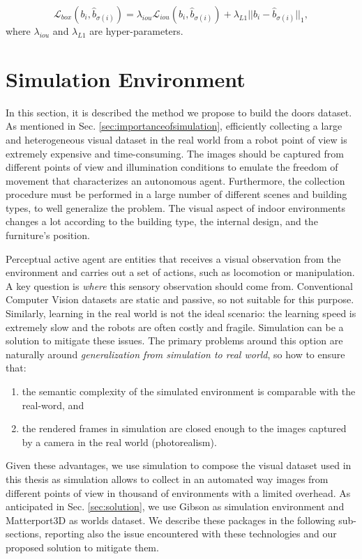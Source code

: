 \begin{equation}
\label{eq:bounding_box_loss}
\mathcal{L}_{box}(b_i, \hat b_{\sigma(i)}) = \lambda_{iou}\mathcal{L}_{iou}(b_i, \hat b_{\sigma(i)}) + \lambda_{L1}||b_i - \hat b_{\sigma(i)}||_1,
\end{equation}
where $\lambda_{iou}$ and $\lambda_{L1}$ are hyper-parameters.

\section{Simulation Environment}

In this section, it is described the method we propose to build the doors dataset. As mentioned in Sec. \ref{sec:importanceofsimulation}, efficiently collecting a large and heterogeneous visual dataset in the real world from a robot point of view is extremely expensive and time-consuming. The images should be captured from different points of view and illumination conditions to emulate the freedom of movement that characterizes an autonomous agent. Furthermore, the collection procedure must be performed in a large number of different scenes and building types, to well generalize the problem. The visual aspect of indoor environments changes a lot according to the building type, the internal design, and the furniture's position. 

Perceptual active agent are entities that receives a visual observation from the environment and carries out a set of actions, such as locomotion or manipulation. A key question is \textit{where} this sensory observation should come from. Conventional Computer Vision datasets \cite{coco, imagenet} are static and passive, so not suitable for this purpose.  Similarly, learning in the real world is not the ideal scenario: the learning speed is extremely slow and the robots are often costly and fragile. Simulation can be a solution to mitigate these issues. 
The primary problems around this option are naturally around \textit{generalization
	from simulation to real world}, so how to ensure that:
\begin{enumerate}
	\item \label{enum:generalizationtorealworld1} the semantic
	complexity of the simulated environment is comparable with the real-word, and
	\item \label{enum:generalizationtorealworld2} the rendered frames in simulation are closed enough to the images captured by a camera in the real world (photorealism).
\end{enumerate} 
Given these advantages, we use simulation to compose the visual dataset used in this thesis as simulation allows to collect in an automated way images from different points of view in thousand of environments with a limited overhead. As anticipated in Sec. \ref{sec:solution}, we use Gibson \cite{gibson} as simulation environment and Matterport3D \cite{matterport} as worlds dataset. We describe these packages in the following sub-sections, reporting also the issue encountered with these technologies and our proposed solution to mitigate them.

